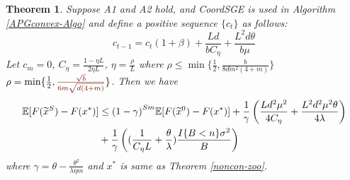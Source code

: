 \documentclass{article}
\newcommand*{\E}{\mathbb{E}}
\newtheorem{theorem}{Theorem}[section]
\theoremstyle{definition}
\theoremstyle{remark}
\begin{document}
\begin{theorem}\label{SC-theo}
Suppose  A1  and  A2  hold, and  CoordSGE  is  used  in  Algorithm \ref{APGconvex-Algo} and define a positive sequence $\{c_t\}$ as follows:
\[
c_{t-1} = c_{t}(1+{\beta})+\frac{Ld}{bC_{\eta}}+\frac{L^2d\theta}{b\mu}
\]
Let $c_m = 0$, $C_{\eta} = \frac{1-\eta L}{2\eta L}$, $\eta = \frac{\rho}{L}$ where $\rho\leq \min\{\frac{1}{2},\frac{b}{8dm^2(4+m)}\}$ $\rho = \min\{\frac{1}{2},{\color{Brown}\frac{\sqrt{b}}{6m\sqrt{d(4+m)}}}\}$. Then we have
\begin{align}\label{main-eq-SC}
\E[F(\widetilde{x}^S) - F(x^*)] & \leq {(1-\gamma)}^{Sm} \E[F(\widetilde{x}^0) - F(x^*)]+\frac{1}{{\gamma}}\left(\frac{Ld^2\mu^2}{4C_{\eta}}+\frac{ L^2d^2\mu^2\theta}{4\lambda}\right)\notag\\
&+ \frac{1}{\gamma}\left((\frac{1}{C_{\eta} L}+\frac{\theta}{\lambda})\frac{I\{B < n\} \sigma ^2}{B}\right)
\end{align}
where $\gamma  = \theta - \frac{ \theta^2}{\lambda\eta m}$ and $x^*$ is same as Theorem \ref{noncon-zoo}.

\end{theorem}
\end{document}
